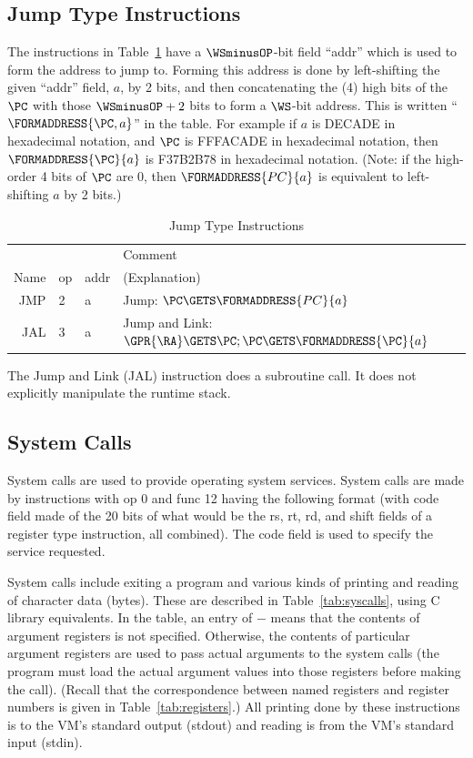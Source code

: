 \documentclass[11pt,letterpaper]{article}
\newcommand{\tabref}[1]{Table~\ref{#1}}  %
\begin{document}
\subsection{Jump Type Instructions}

The instructions in \tabref{tab:jumpinstrs} have a $\WSminusOP$-bit field ``addr''
which is used to form the address to jump to.
Forming this address is done by left-shifting the given ``addr''
field, $a$, by 2 bits,
and then concatenating the (4) high bits of the $\PC$ with those
$\WSminusOP+2$ bits to form a $\WS$-bit address.
This is written ``$\FORMADDRESS{\PC,a}$'' in the table.
For example if $a$ is DECADE in hexadecimal notation, and $\PC$ is
FFFACADE in hexadecimal notation, then $\FORMADDRESS{\PC}{a}$ is F37B2B78
in hexadecimal notation. (Note: if the high-order 4 bits of $\PC$
are 0, then $\FORMADDRESS{PC}{a}$ is equivalent to left-shifting $a$
by 2 bits.)

\begin{table}[htbp]
\caption{Jump Type Instructions}
\label{tab:jumpinstrs}  
\begin{tabular}{|r|l|l|p{11cm}|}
\hline
~      & ~  & ~    & Comment \\
Name   & op & addr & (Explanation) \\
\hline
JMP    & 2  & a    & Jump: $\PC \GETS \FORMADDRESS{PC}{a}$ \\
\hline
JAL    & 3  & a    & Jump and Link: $\GPR{\RA} \GETS \PC; \PC \GETS \FORMADDRESS{\PC}{a}$ \\
\hline
\end{tabular}
\end{table}

The Jump and Link (JAL) instruction does a subroutine call. It does
not explicitly manipulate the runtime stack.

\subsection{System Calls}
\label{sec:syscall}

System calls are used to provide operating system services.
System calls are made by instructions with op 0 and func 12 having the
following format (with code field made of the 20 bits of what would
be the rs, rt, rd, and shift fields of a register type instruction,
all combined).
The code field is used to specify the service requested.

System calls include exiting a program and various kinds of printing
and reading of character data (bytes).
These are described in \tabref{tab:syscalls},
using C library equivalents.
In the table, an entry of $-$ means that the contents of argument registers 
is not specified.
Otherwise, the contents of particular argument registers are used to
pass actual arguments to the system calls (the program must load the
actual argument values into those registers before making the call).
(Recall that the correspondence between named registers and register
numbers is given in \tabref{tab:registers}.)
All printing done by these instructions
is to the VM's standard output (stdout) and
reading is from the VM's standard input (stdin).
\end{document}
